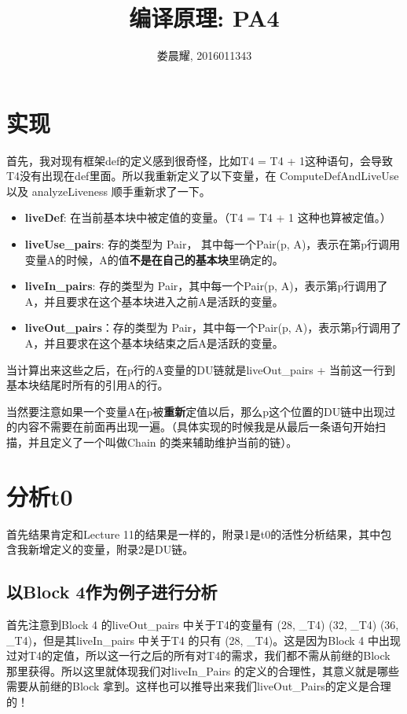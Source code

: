 \documentclass{article}
\title{编译原理: PA4}
\author{娄晨耀, 2016011343}
\date{}
\theoremstyle{plain}
\theoremstyle{definition}
\begin{document}
    \maketitle

    \section{实现}

    首先，我对现有框架def的定义感到很奇怪，比如T4 = T4 + 1这种语句，会导致T4没有出现在def里面。所以我重新定义了以下变量，在 ComputeDefAndLiveUse 以及 analyzeLiveness 顺手重新求了一下。

    \begin{itemize}
        \item \textbf{liveDef}: 在当前基本块中被定值的变量。（T4 = T4 + 1 这种也算被定值。）
        \item \textbf{liveUse\_pairs}: 存的类型为 Pair， 其中每一个Pair(p, A)，表示在第p行调用变量A的时候，A的值\textbf{不是在自己的基本块}里确定的。
        \item \textbf{liveIn\_pairs}: 存的类型为 Pair，其中每一个Pair(p, A)，表示第p行调用了A，并且要求在这个基本块进入之前A是活跃的变量。
        \item \textbf{liveOut\_pairs}：存的类型为 Pair，其中每一个Pair(p, A)，表示第p行调用了A，并且要求在这个基本块结束之后A是活跃的变量。
    \end{itemize}

    当计算出来这些之后，在p行的A变量的DU链就是liveOut\_pairs + 当前这一行到基本块结尾时所有的引用A的行。
    
    当然要注意如果一个变量A在p被\textbf{重新}定值以后，那么p这个位置的DU链中出现过的内容不需要在前面再出现一遍。（具体实现的时候我是从最后一条语句开始扫描，并且定义了一个叫做Chain 的类来辅助维护当前的链）。

    \section{分析t0}

    首先结果肯定和Lecture 11的结果是一样的，附录1是t0的活性分析结果，其中包含我新增定义的变量，附录2是DU链。
    
    \subsection{以Block 4作为例子进行分析}

    首先注意到Block 4 的liveOut\_pairs 中关于T4的变量有 (28, \_T4) (32, \_T4) (36, \_T4)，但是其liveIn\_pairs 中关于T4 的只有 (28, \_T4)。这是因为Block 4 中出现过对T4的定值，所以这一行之后的所有对T4的需求，我们都不需从前继的Block 那里获得。所以这里就体现我们对liveIn\_Pairs 的定义的合理性，其意义就是哪些需要从前继的Block 拿到。这样也可以推导出来我们liveOut\_Pairs的定义是合理的！
\end{document}

